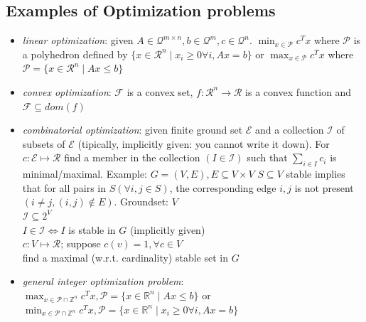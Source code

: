 \documentclass[main]{subfiles}
\begin{document}
\subsection{Examples of Optimization problems}
\begin{itemize}
\item \emph{linear optimization}: given $A \in \mathcal{Q}^{m \times n}, b \in
\mathcal{Q}^{m}, c \in \mathcal{Q}^{n}$. $\displaystyle \min_{x \in
\mathcal{P}} c^{T}x$ where $\mathcal{P}$ is a polyhedron defined by $\{ x \in
\mathcal{R}^{n} \mid x_{i} \geq 0 \forall i, Ax = b \}$ or $\displaystyle
\max_{x \in \mathcal{P}} c^{T}x$ where $\mathcal{P} = \{ x \in
\mathcal{R}^{n} \mid Ax \leq b \}$

\item \emph{convex optimization}: $\mathcal{F}$ is a convex set, $f:
\mathcal{R}^{n} \rightarrow \mathcal{R}$ is a convex function and $\mathcal{F}
\subseteq dom(f)$


\item \emph{combinatorial optimization}: given finite ground set $\mathcal{E}$
and a collection $\mathcal{I}$ of subsets of $\mathcal{E}$ (tipically,
implicitly given: you cannot write it down).
For $c: \mathcal{E} \mapsto \mathcal{R}$ find a member in the collection $(I
\in \mathcal{I})$ such that $\sum_{i \in I} c_{i}$ is minimal/maximal.
Example: $G = (V, E), E \subseteq V \times V$
$S \subseteq V$ stable implies that for all pairs in $S (\forall i,j \in S)$,
the corresponding edge $i,j$ is not present $(i \neq j, (i,j) \notin E)$.
Groundset: $V$ \\
$\mathcal{I} \subseteq 2^{V}$ \\
$I \in \mathcal{I} \iff I$ is stable in $G$ (implicitly given) \\
$c: V \mapsto \mathcal{R}$; suppose $c(v) = 1, \forall c \in V$ \\
find a maximal (w.r.t. cardinality) stable set in $G$

\item \emph{general integer optimization problem}: \\
$\displaystyle \max_{x \in \mathcal{P} \cap \mathbb{Z}^{n}} c^{T}x,
\mathcal{P} = \{ x \in \mathbb{R}^{n} \mid Ax \leq b \}$
or 
$\displaystyle \min_{x \in \mathcal{P} \cap \mathbb{Z}^{n}} c^{T}x,
\mathcal{P} = \{ x \in \mathbb{R}^{n} \mid x_{i} \geq 0 \forall i, Ax = b \}$

\end{itemize}
\end{document}
